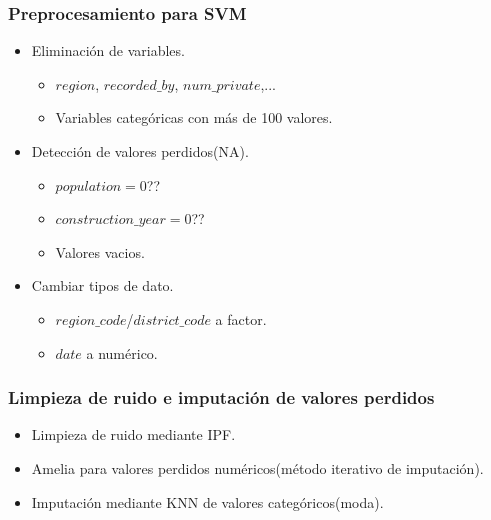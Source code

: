 \begin{frame}
\frametitle{Preprocesamiento para SVM}

\begin{itemize}
	\item Eliminación de variables. 
	\begin{itemize}
		\item $region$, $recorded\_by$, $num\_private$,...
		\item Variables categóricas con más de 100 valores.
	\end{itemize}
	\pause
	\item Detección de valores perdidos(NA).
	\begin{itemize}
		\item $population = 0$??
		\item $construction\_year = 0$??
		\item Valores vacios.
	\end{itemize}
	\pause
	\item Cambiar tipos de dato.
	\begin{itemize}
		\item $region\_code$/$district\_code$ a factor.
		\item $date$ a numérico.
	\end{itemize}
\end{itemize}



\end{frame}


\begin{frame}

\frametitle{Limpieza de ruido e imputación de valores perdidos}

\begin{itemize}
	
	\item Limpieza de ruido mediante IPF\cite{ipf}.
	
	\item Amelia \cite{amelia} para valores perdidos numéricos(método iterativo de imputación).
	
	
	\item Imputación mediante KNN\cite{knnimputer} de valores categóricos(moda).
	
	
\end{itemize}

\end{frame}


